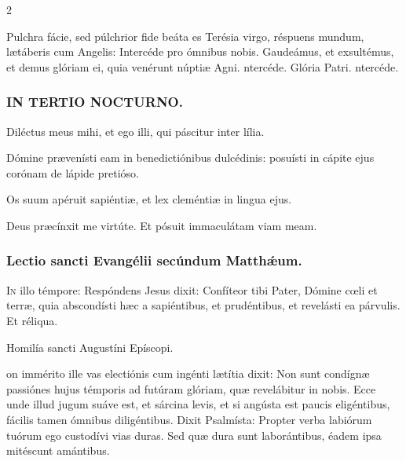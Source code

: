 \documentclass[9pt,twoside]{extarticle}
\begin{document}
\begin{multicols}{2}
\begin{tightlist}{}
\item {} Pulchra fácie, sed púlchrior fide beáta es Terésia virgo, réspuens mundum, lætáberis cum Angelis: \textred{*} Intercéde pro ómnibus nobis.  Gaudeámus, et exsultémus, et demus glóriam ei, quia venérunt núptiæ Agni. ntercéde. Glória Patri. ntercéde.
\end{tightlist}

\subsubsection*{\center \textsc{IN TERTIO NOCTURNO.}}
\begin{tightlist}{}
\item {} Diléctus meus mihi, et ego illi, qui páscitur inter lília.
\item {} Dómine prævenísti eam in benedictiónibus dulcédinis: posuísti in cápite ejus corónam de lápide pretióso.
\item {} Os suum apéruit sapiéntiæ, et lex cleméntiæ in lingua ejus. 
\item {} Deus præcínxit me virtúte.  Et pósuit immaculátam viam meam.
\end{tightlist}

\subsubsection*{\center Lectio sancti Evangélii secúndum Matthǽum.}
\begin{center}\end{center}
\lettrine{I}n illo témpore: Respóndens Jesus dixit: Confíteor tibi Pater, Dómine cœli et terræ, quia abscondísti hæc a sapiéntibus, et prudéntibus, et revelásti ea párvulis. Et réliqua.

\begin{center}Homilía sancti Augustíni Epíscopi.\\
\end{center}
on immérito ille vas electiónis cum ingénti lætítia dixit: Non sunt condígnæ passiónes hujus témporis ad futúram glóriam, quæ revelábitur in nobis. Ecce unde illud jugum suáve est, et sárcina levis, et si angústa est paucis eligéntibus, fácilis tamen ómnibus diligéntibus. Dixit Psalmísta: Propter verba labiórum tuórum ego custodívi vias duras. Sed quæ dura sunt laborántibus, éadem ipsa mitéscunt amántibus.


\end{multicols}
\end{document}
